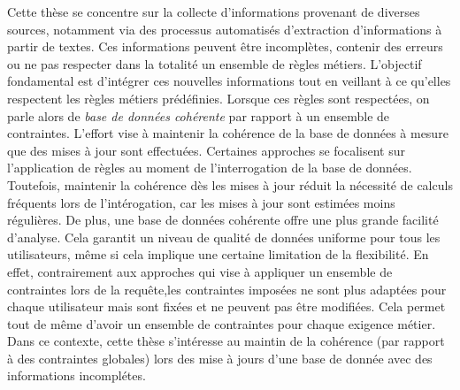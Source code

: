 Cette thèse se concentre sur la collecte d'informations provenant de diverses sources, notamment via des processus automatisés d'extraction d'informations à partir de textes.
Ces informations peuvent être incomplètes, contenir des erreurs ou ne pas respecter dans la totalité un ensemble de règles métiers.
L'objectif fondamental est d'intégrer ces nouvelles informations tout en veillant à ce qu'elles respectent les règles métiers prédéfinies.
Lorsque ces règles sont respectées, on parle alors de \emph{base de données cohérente} par rapport à un ensemble de contraintes.
L'effort vise à maintenir la cohérence de la base de données à mesure que des mises à jour sont effectuées.
Certaines approches se focalisent sur l'application de règles au moment de l'interrogation de la base de données.
Toutefois, maintenir la cohérence dès les mises à jour réduit la nécessité de calculs fréquents lors de l'intérogation, car les mises à jour sont estimées moins régulières.
De plus, une base de données cohérente offre une plus grande facilité d'analyse. %
Cela garantit un niveau de qualité de données uniforme pour tous les utilisateurs, même si cela implique une certaine limitation de la flexibilité.
En effet, contrairement aux approches qui vise à appliquer un ensemble de contraintes lors de la requête,les contraintes imposées ne sont plus adaptées pour chaque utilisateur mais sont fixées et ne peuvent pas être modifiées.
Cela permet tout de même d'avoir un ensemble de contraintes pour chaque exigence métier.
Dans ce contexte, cette thèse s'intéresse au maintin de la cohérence (par rapport à des contraintes globales) lors des mise à jours d'une base de donnée avec des informations incomplétes.

